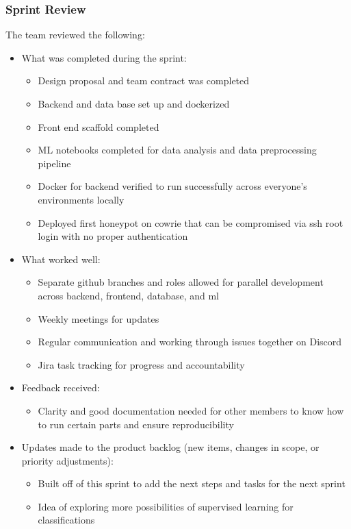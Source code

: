 \documentclass{article}
\begin{document}
\subsubsection{Sprint Review}
The team reviewed the following:
\begin{itemize}
    \item What was completed during the sprint:
    \begin{itemize}
        \item Design proposal and team contract was completed 
        \item Backend and data base set up and dockerized 
        \item Front end scaffold completed
        \item ML notebooks completed for data analysis and data preprocessing pipeline 
        \item Docker for backend verified to run successfully across everyone's environments locally 
        \item Deployed first honeypot on cowrie that can be compromised via ssh root login with no proper authentication
    \end{itemize}
    \item What worked well:
    \begin{itemize}
        \item Separate github branches and roles allowed for parallel development across backend, frontend, database, and ml
        \item Weekly meetings for updates
        \item Regular communication and working through issues together on Discord
        \item Jira task tracking for progress and accountability
    \end{itemize}
    \item Feedback received:
    \begin{itemize}
        \item Clarity and good documentation needed for other members to know how to run certain parts and ensure reproducibility 
    \end{itemize}
    \item Updates made to the product backlog (new items, changes in scope, or priority adjustments):
    \begin{itemize}
        \item Built off of this sprint to add the next steps and tasks for the next sprint 
        \item Idea of exploring more possibilities of supervised learning for classifications 
    \end{itemize}
\end{itemize}
\end{document}
